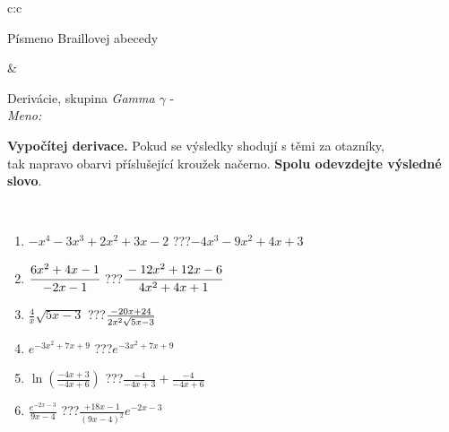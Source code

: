 \documentclass[10pt]{report}
\begin{document}
\begin{tabular}{c:c}
\begin{minipage}[c][104.5mm][t]{0.5\linewidth}
\begin{center}
\begin{minipage}{0.20\linewidth}
\begin{center}
{\small Písmeno Braillovej abecedy}
\end{center}
\end{minipage}
\end{center}
\end{minipage}
&
\begin{minipage}[c][104.5mm][t]{0.5\linewidth}
\begin{center}
\vspace{7mm}
{\huge Derivácie, skupina \textit{Gamma $\gamma$} -}\\[5mm]
\textit{Meno:}\phantom{xxxxxxxxxxxxxxxxxxxxxxxxxxxxxxxxxxxxxxxxxxxxxxxxxxxxxxxxxxxxxxxxx}\\[5mm]
\begin{minipage}{0.95\linewidth}
\begin{center}
\textbf{Vypočítej derivace.} Pokud se výsledky shodují s těmi za otazníky,\\tak napravo obarvi příslušející kroužek načerno. \textbf{Spolu odevzdejte výsledné slovo}.
\end{center}
\end{minipage}
\\[1mm]
\begin{minipage}{0.79\linewidth}
\begin{center}
\begin{varwidth}{\linewidth}
\begin{enumerate}
\normalsize
\item $-x^4-3x^3+2x^2+3x-2$\quad \dotfill\; ???\;\dotfill \quad $-4x^3-9x^2+4x+3$
\item $\cfrac{6x^2+4x-1}{-2x-1}$\quad \dotfill\; ???\;\dotfill \quad $\cfrac{-12x^2+12x-6}{4x^2+4x+1}$
\item $\frac{4}{x}\sqrt{5x-3}$\quad \dotfill\; ???\;\dotfill \quad $\frac{-20x+24}{2x^2 \sqrt{\smash[b]{5x-3}}}$
\item $e^{-3x^2+7x+9}$\quad \dotfill\; ???\;\dotfill \quad $e^{-3x^2+7x+9}$
\item $\ln{\left(\frac{-4x+3}{-4x+6}\right)}$\quad \dotfill\; ???\;\dotfill \quad $\frac{-4}{-4x+3}+\frac{-4}{-4x+6}$
\item $\frac{e^{-2x-3}}{9x-4}$\quad \dotfill\; ???\;\dotfill \quad $\frac{+18x-1}{(9x-4)^2}e^{-2x-3}$
\end{enumerate}
\end{varwidth}
\end{center}
\end{minipage}
\begin{minipage}{0.20\linewidth}
\begin{center}

\end{center}
\end{minipage}
\end{center}
\end{minipage}
\end{tabular}
\end{document}
